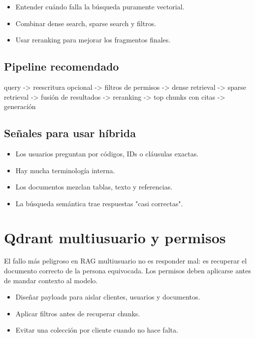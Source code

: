 \documentclass[11pt,a4paper]{book}
\begin{document}
\begin{itemize}\item Entender cuándo falla la búsqueda puramente vectorial.\end{itemize}
\begin{itemize}\item Combinar dense search, sparse search y filtros.\end{itemize}
\begin{itemize}\item Usar reranking para mejorar los fragmentos finales.\end{itemize}
\section{Pipeline recomendado}
\begin{codebox}
query
  -> reescritura opcional
  -> filtros de permisos
  -> dense retrieval
  -> sparse retrieval
  -> fusión de resultados
  -> reranking
  -> top chunks con citas
  -> generación
\end{codebox}
\section{Señales para usar híbrida}
\begin{itemize}\item Los usuarios preguntan por códigos, IDs o cláusulas exactas.\end{itemize}
\begin{itemize}\item Hay mucha terminología interna.\end{itemize}
\begin{itemize}\item Los documentos mezclan tablas, texto y referencias.\end{itemize}
\begin{itemize}\item La búsqueda semántica trae respuestas "casi correctas".\end{itemize}
\chapter{Qdrant multiusuario y permisos}
El fallo más peligroso en RAG multiusuario no es responder mal: es recuperar el documento correcto de la persona equivocada. Los permisos deben aplicarse antes de mandar contexto al modelo.

\begin{itemize}\item Diseñar payloads para aislar clientes, usuarios y documentos.\end{itemize}
\begin{itemize}\item Aplicar filtros antes de recuperar chunks.\end{itemize}
\begin{itemize}\item Evitar una colección por cliente cuando no hace falta.\end{itemize}
\end{document}
